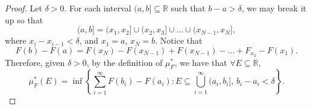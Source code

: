 \documentclass[notoc,notitlepage]{tufte-book}
\begin{document}
\begin{proof}
  Let $\delta > 0$. For each interval $(a, b] \subseteq \mathbb{R}$
  such that $b - a > \delta$, we may break it up so that
  \begin{equation*}
    (a, b] = (x_1, x_2] \cup (x_2, x_3] \cup \hdots \cup (x_{N-1}, x_N],
  \end{equation*}
  where $x_i - x_{i-1} < \delta$, and $x_1 = a$, $x_N = b$.
  Notice that
  \begin{equation*}
    F(b) - F(a) = F(x_N) - F(x_{N-1}) + F(x_{N-1}) - \hdots + F_{x_2} - F(x_1).
  \end{equation*}
  Therefore, given $\delta > 0$, by the definition of $\mu_F^*$,
  we have that $\forall E \subseteq \mathbb{R}$,
  \begin{equation*}
    \mu_F^*(E) = \inf \left\{ 
      \sum_{i=1}^{\infty} F(b_i) - F(a_i)
      : E \subseteq \bigcup_{i=1}^{\infty} (a_i, b_i],\,
        b_i - a_i < \delta
    \right\}.
  \end{equation*}


\end{proof}
\end{document}
